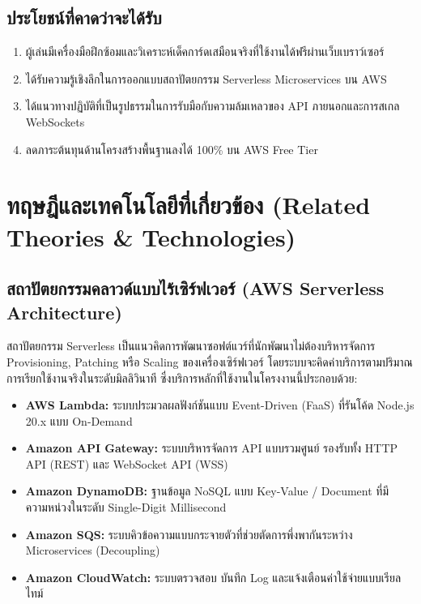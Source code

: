 \documentclass[12pt,a4paper]{report}
\begin{document}
\section{ประโยชน์ที่คาดว่าจะได้รับ}
\begin{enumerate}
    \item ผู้เล่นมีเครื่องมือฝึกซ้อมและวิเคราะห์เด็คการ์ดเสมือนจริงที่ใช้งานได้ฟรีผ่านเว็บเบราว์เซอร์
    \item ได้รับความรู้เชิงลึกในการออกแบบสถาปัตยกรรม Serverless Microservices บน AWS
    \item ได้แนวทางปฏิบัติที่เป็นรูปธรรมในการรับมือกับความล้มเหลวของ API ภายนอกและการสเกล WebSockets
    \item ลดภาระต้นทุนด้านโครงสร้างพื้นฐานลงได้ 100\% บน AWS Free Tier
\end{enumerate}

\chapter{ทฤษฎีและเทคโนโลยีที่เกี่ยวข้อง (Related Theories \& Technologies)}

\section{สถาปัตยกรรมคลาวด์แบบไร้เซิร์ฟเวอร์ (AWS Serverless Architecture)}
สถาปัตยกรรม Serverless เป็นแนวคิดการพัฒนาซอฟต์แวร์ที่นักพัฒนาไม่ต้องบริหารจัดการ Provisioning, Patching หรือ Scaling ของเครื่องเซิร์ฟเวอร์ โดยระบบจะคิดค่าบริการตามปริมาณการเรียกใช้งานจริงในระดับมิลลิวินาที ซึ่งบริการหลักที่ใช้งานในโครงงานนี้ประกอบด้วย:
\begin{itemize}
    \item \textbf{AWS Lambda:} ระบบประมวลผลฟังก์ชันแบบ Event-Driven (FaaS) ที่รันโค้ด Node.js 20.x แบบ On-Demand
    \item \textbf{Amazon API Gateway:} ระบบบริหารจัดการ API แบบรวมศูนย์ รองรับทั้ง HTTP API (REST) และ WebSocket API (WSS)
    \item \textbf{Amazon DynamoDB:} ฐานข้อมูล NoSQL แบบ Key-Value / Document ที่มีความหน่วงในระดับ Single-Digit Millisecond
    \item \textbf{Amazon SQS:} ระบบคิวข้อความแบบกระจายตัวที่ช่วยตัดการพึ่งพากันระหว่าง Microservices (Decoupling)
    \item \textbf{Amazon CloudWatch:} ระบบตรวจสอบ บันทึก Log และแจ้งเตือนค่าใช้จ่ายแบบเรียลไทม์
\end{itemize}
\end{document}
